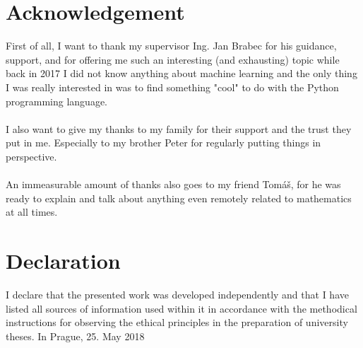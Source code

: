 \documentclass[11pt]{article}
\begin{document}
  \section*{Acknowledgement}
    \thispagestyle{empty}
    First of all, I want to thank my supervisor Ing. Jan Brabec for his guidance, support, and for offering me such an interesting (and exhausting) topic while back in 2017 I did not know anything about machine learning and the only thing I was really interested in was to find something "cool"{ }to do with the Python programming language.
    \\~\\
    I also want to give my thanks to my family for their support and the trust they put in me. Especially to my brother Peter for regularly putting things in perspective.
    \\~\\
    An immeasurable amount of thanks also goes to my friend Tomáš, for he was ready to explain and talk about anything even remotely related to mathematics at all times.
  \newpage
  \section*{Declaration}
    \thispagestyle{empty}
    I declare that the presented work was developed independently and that I have listed all sources of information used within it in accordance with the methodical instructions for observing the ethical principles in the preparation of university theses. In Prague, 25. May 2018
  \newpage
\end{document}
